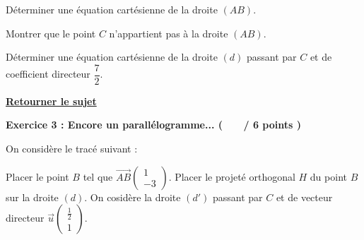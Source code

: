 \documentclass[12pt,a4paper]{exam}
\newcommand*{\Coord}[2]{%
  \ensuremath{
    \begin{pmatrix}
      #1 \\[0pt]
      #2
    \end{pmatrix}}
}
\begin{document}
\begin{questions}

\question[2] Déterminer une équation cartésienne de la droite $(AB)$.

\question[2] Montrer que le point $C$ n'appartient pas à la droite $(AB)$.

\question[2] Déterminer une équation cartésienne de la droite $(d)$ passant par $C$ et de coefficient 
directeur $\dfrac{7}{2}$.

\end{questions}

\vspace{2cm}

\begin{center}
    \underline{\textbf{Retourner le sujet}}
\end{center}


\newpage
\noindent
\textbf{Exercice 3 : Encore un parallélogramme... ( \ \ \ / 6 points )}

\vspace{10pt}
On considère le tracé suivant : 

\begin{center}
\end{center}

\begin{questions}
    \question[2] Placer le point $B$ tel que $\overrightarrow{AB} \Coord{1}{-3}$.
    \question[1] Placer le projeté orthogonal $H$ du point $B$ sur la droite $(d)$.
    \question On cosidère la droite $(d')$ passant par $C$ et de vecteur directeur
    $\overrightarrow{u}\Coord{\frac{1}{2}}{1}$.
\end{questions}
\end{document}
